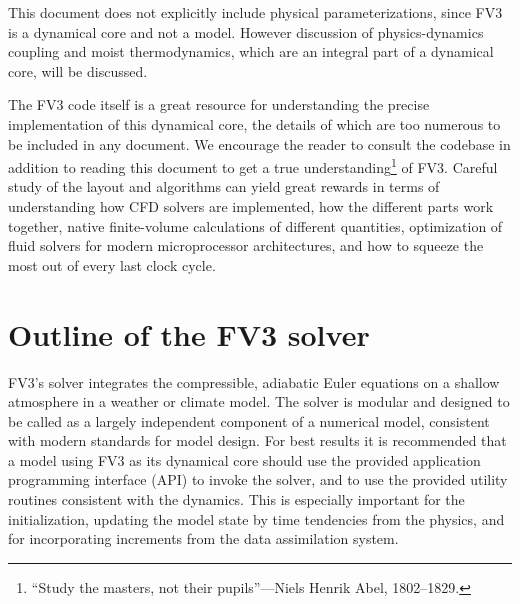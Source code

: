 \documentclass[10pt,letterpaper,margin=1in]{memoir}
\begin{document}
This document does not explicitly include physical parameterizations, since FV3 is a dynamical core and not a model. However discussion of physics-dynamics coupling and moist thermodynamics, which are an integral part of a dynamical core, will be discussed. 



The FV3 code itself is a great resource for understanding the precise implementation of this dynamical core, the details of which are too numerous to be included in any document. We encourage the reader to consult the codebase in addition to reading this document to get a true understanding\footnote{``Study the masters, not their pupils''---Niels Henrik Abel, 1802--1829.} of FV3. Careful study of the layout and algorithms can yield great rewards in terms of understanding how CFD solvers are implemented, how the different parts work together, native finite-volume calculations of different quantities, optimization of fluid solvers for modern microprocessor architectures, and how to squeeze the most out of every last clock cycle.


\chapter{Outline of the FV3 solver}

FV3's solver integrates the compressible, adiabatic Euler equations on a shallow atmosphere in a weather or climate model. The solver is modular and designed to be called as a largely independent component of a numerical model, consistent with modern standards for model design. For best results it is recommended that a model using FV3 as its dynamical core should use the provided application programming interface (API) to invoke the solver, and to use the provided utility routines consistent with the dynamics. This is especially important for the initialization, updating the model state by time tendencies from the physics, and for incorporating increments from the data assimilation system.
\end{document}
